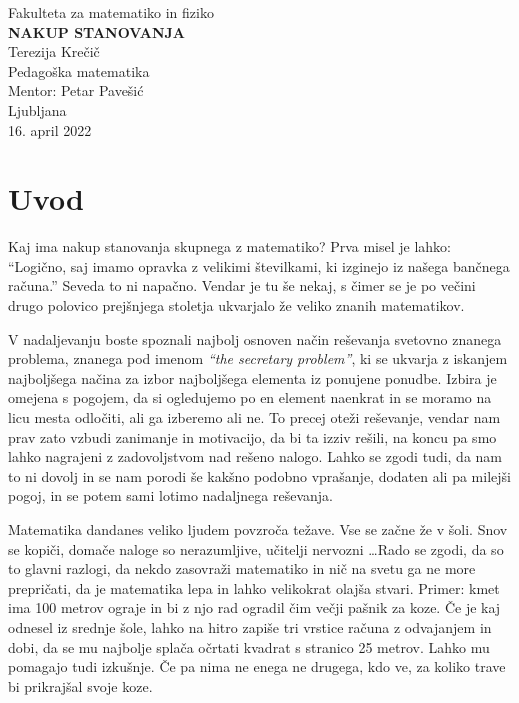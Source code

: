 \documentclass[a4paper, 12pt, titlepage]{article}
\begin{document}
\begin{titlepage}
    \begin{center}
        \large
        Fakulteta za matematiko in fiziko\\
        \vspace{8cm}
        \Huge
        \textbf{NAKUP STANOVANJA} \\
        \vspace{7cm}
        \large
        Terezija Krečič\\
        Pedagoška matematika\\
        \vspace{1cm}
        Mentor: Petar Pavešić\\
        \vspace{0.5cm}
        Ljubljana\\
        16. april 2022
    \end{center}
\end{titlepage}

\tableofcontents
\newpage

\section{Uvod}

Kaj ima nakup stanovanja skupnega z matematiko? Prva misel je lahko: ``Logično, saj imamo opravka z velikimi številkami, ki izginejo iz našega bančnega računa.'' Seveda to ni napačno. Vendar je tu še nekaj, s čimer se je po večini drugo polovico prejšnjega stoletja ukvarjalo že veliko znanih matematikov.

V nadaljevanju boste spoznali najbolj osnoven način reševanja svetovno znanega problema, znanega pod imenom \emph{``the secretary problem''}, ki se ukvarja z iskanjem najboljšega načina za izbor najboljšega elementa iz ponujene ponudbe. Izbira je omejena s pogojem, da si ogledujemo po en element naenkrat in se moramo na licu mesta odločiti, ali ga izberemo ali ne. To precej oteži reševanje, vendar nam prav zato vzbudi zanimanje in motivacijo, da bi ta izziv rešili, na koncu pa smo lahko nagrajeni z zadovoljstvom nad rešeno nalogo. Lahko se zgodi tudi, da nam to ni dovolj in se nam porodi še kakšno podobno vprašanje, dodaten ali pa milejši pogoj, in se potem sami lotimo nadaljnega reševanja.

Matematika dandanes veliko ljudem povzroča težave. Vse se začne že v šoli. Snov se kopiči, domače naloge so nerazumljive, učitelji nervozni \ldots Rado se zgodi, da so to glavni razlogi, da nekdo zasovraži matematiko in nič na svetu ga ne more prepričati, da je matematika lepa in lahko velikokrat olajša stvari. Primer: kmet ima 100 metrov ograje in bi z njo rad ogradil čim večji pašnik za koze. Če je kaj odnesel iz srednje šole, lahko na hitro zapiše tri vrstice računa z odvajanjem in dobi, da se mu najbolje splača očrtati kvadrat s stranico 25 metrov. Lahko mu pomagajo tudi izkušnje. Če pa nima ne enega ne drugega, kdo ve, za koliko trave bi prikrajšal svoje koze.
\end{document}
